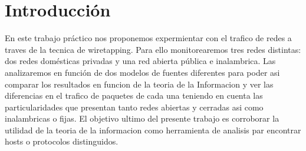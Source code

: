 \section{Introducción}

En este trabajo práctico nos proponemos expermientar con el trafico de redes a traves de la tecnica de wiretapping. Para ello monitorearemos tres redes distintas: dos redes domésticas privadas y una red abierta pública e inalambrica. 
Las analizaremos en función de dos modelos de fuentes diferentes para poder asi comparar los resultados en funcion de la teoria de la Informacion y ver las diferencias en el trafico de paquetes de cada una teniendo en cuenta las particularidades que presentan tanto redes abiertas y cerradas asi como inalambricas o fijas.
El objetivo ultimo del presente trabajo es corroborar la utilidad de la teoria de la informacion como herramienta de analisis par encontrar hosts o protocolos distinguidos.

